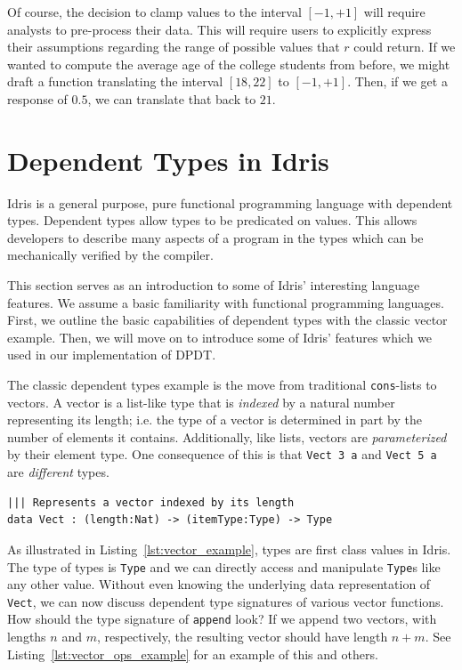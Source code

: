 \documentclass[12pt]{report}
\begin{document}
Of course, the decision to clamp values to the interval $[-1,+1]$ will require analysts to pre-process their data.
This will require users to explicitly express their assumptions regarding the range of possible values that $r$ could return.
If we wanted to compute the average age of the college students from before, we might draft a function translating the interval $[18,22]$ to $[-1,+1]$.
Then, if we get a response of $0.5$, we can translate that back to $21$.

\chapter{Dependent Types in Idris}\label{sec:dependent_types_in_idris}

Idris is a general purpose, pure functional programming language with dependent types.
Dependent types allow types to be predicated on values.
This allows developers to describe many aspects of a program in the types which can be mechanically verified by the compiler.

This section serves as an introduction to some of Idris' interesting language features.
We assume a basic familiarity with functional programming languages.
First, we outline the basic capabilities of dependent types with the classic vector example.
Then, we will move on to introduce some of Idris' features which we used in our implementation of DPDT.

The classic dependent types example is the move from traditional \texttt{cons}-lists to vectors.
A vector is a list-like type that is \textit{indexed} by a natural number representing its length; i.e. the type of a vector is determined in part by the number of elements it contains.
Additionally, like lists, vectors are \textit{parameterized} by their element type.
One consequence of this is that \texttt{Vect 3 a} and \texttt{Vect 5 a} are \textit{different} types.

\begin{lstlisting}[caption={Vector Example},label={lst:vector_example}]
||| Represents a vector indexed by its length
data Vect : (length:Nat) -> (itemType:Type) -> Type
\end{lstlisting}

As illustrated in Listing~\ref{lst:vector_example}, types are first class values in Idris.
The type of types is \texttt{Type} and we can directly access and manipulate \texttt{Type}s like any other value.
Without even knowing the underlying data representation of \texttt{Vect}, we can now discuss dependent type signatures of various vector functions.
How should the type signature of \texttt{append} look?
If we append two vectors, with lengths $n$ and $m$, respectively, the resulting vector should have length $n+m$.
See Listing~\ref{lst:vector_ops_example} for an example of this and others.
\end{document}
